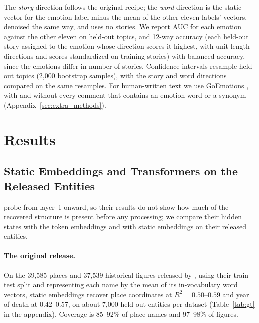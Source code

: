 \documentclass[11pt]{article}
\begin{document}
The \emph{story} direction follows the original recipe; the \emph{word} direction is the static vector for the emotion label minus the mean of the other eleven labels' vectors, denoised the same way, and uses no stories. We report AUC for each emotion against the other eleven on held-out topics, and 12-way accuracy (each held-out story assigned to the emotion whose direction scores it highest, with unit-length directions and scores standardized on training stories) with balanced accuracy, since the emotions differ in number of stories. Confidence intervals resample held-out topics (2{,}000 bootstrap samples), with the story and word directions compared on the same resamples. For human-written text we use GoEmotions \citep{demszky2020goemotions}, with and without every comment that contains an emotion word or a synonym (Appendix~\ref{sec:extra_methods}).

\section{Results}
\label{sec:results}

\subsection{Static Embeddings and Transformers on the Released Entities}
\label{sec:llm}

\citet{gurnee2024language} probe from layer~1 onward, so their results do not show how much of
the recovered structure is present before any processing; we compare their hidden states with
the token embeddings and with static embeddings on their released entities.

\paragraph{The original release.}
On the 39{,}585 places and 37{,}539 historical figures released by
\citet{gurnee2024language}, using their train--test split and representing each name by
the mean of its in-vocabulary word vectors, static embeddings recover place coordinates at
$R^2 = 0.50$--$0.59$ and year of death at $0.42$--$0.57$, on about 7{,}000 held-out
entities per dataset (Table~\ref{tab:gt} in the appendix). Coverage is 85--92\% of place names and
97--98\% of figures. 
\end{document}
